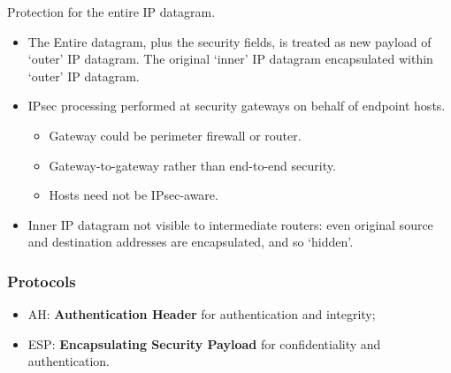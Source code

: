 \documentclass[a4paper, 10pt, titlepage]{article}
\begin{document}
Protection for the entire IP datagram.	
\begin{itemize}
	\item The Entire datagram, plus the security fields, is treated as new payload of ‘outer’ IP datagram. The original ‘inner’ IP datagram encapsulated within ‘outer’ IP datagram. 
	\item IPsec processing performed at security gateways on behalf of endpoint hosts.
	\begin{itemize}
		\item Gateway could be perimeter firewall or router.
		\item Gateway-to-gateway rather than end-to-end security.
		\item Hosts need not be IPsec-aware.
	\end{itemize}
\item Inner IP datagram not visible to intermediate routers: even original source and destination addresses are encapsulated, and so ‘hidden’.
\end{itemize}

\subsubsection*{Protocols}
\begin{itemize}
	\item AH: \textbf{Authentication Header} for authentication and 	integrity;
	\item ESP: \textbf{Encapsulating Security Payload} for confidentiality and authentication.
\end{itemize}
\end{document}
